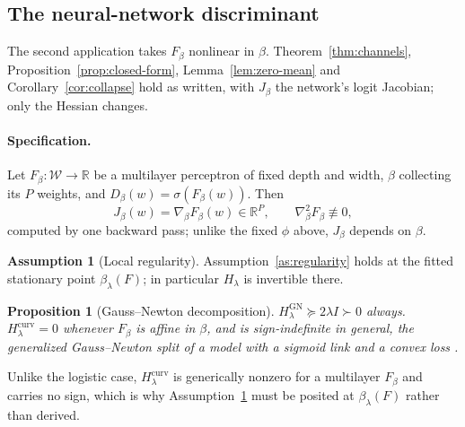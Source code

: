\documentclass[11pt]{article}
\theoremstyle{plain}
\newtheorem{mypropo}{Proposition}
\theoremstyle{definition}
\newtheorem{assumption}{Assumption}
\theoremstyle{remark}
\newcommand{\R}{\mathbb{R}}
\newcommand{\cW}{\ensuremath{\mathcal{W}}}
\begin{document}
\subsection{The neural-network discriminant}
\label{sec:mcd-mlp}

The second application takes $F_\beta$ nonlinear in $\beta$. Theorem~\ref{thm:channels},
Proposition~\ref{prop:closed-form}, Lemma~\ref{lem:zero-mean} and Corollary~\ref{cor:collapse}
hold as written, with $J_\beta$ the network's logit Jacobian; only the Hessian changes.

\paragraph{Specification.}
\label{sec:mcd-mlp-spec}
Let $F_\beta:\cW\to\R$ be a multilayer perceptron of fixed depth and width, $\beta$ collecting
its $P$ weights, and $D_\beta(w)=\sigma(F_\beta(w))$. Then
\begin{equation}
J_\beta(w) = \nabla_\beta F_\beta(w) \in \R^{P},
\qquad
\nabla^2_\beta F_\beta \not\equiv 0 ,
\label{eq:mlp-logit}
\end{equation}
computed by one backward pass; unlike the fixed $\phi$ above, $J_\beta$ depends on $\beta$.

\label{sec:mcd-mlp-ggn}
\begin{assumption}[Local regularity]
\label{as:smooth-mlp}
Assumption~\ref{as:regularity} holds at the fitted stationary point $\beta_\lambda(F)$; in
particular $H_\lambda$ is invertible there.
\end{assumption}

\begin{mypropo}[Gauss--Newton decomposition]
\label{prop:ggn}
$H_\lambda^{\mathrm{GN}} \succeq 2\lambda I \succ 0$ always. $H_\lambda^{\mathrm{curv}} = 0$
whenever $F_\beta$ is affine in $\beta$, and is sign-indefinite in general, the generalized
Gauss--Newton split of a model with a sigmoid link and a convex loss \citep{martens2020}.
\end{mypropo}

Unlike the logistic case, $H_\lambda^{\mathrm{curv}}$ is generically nonzero for a multilayer
$F_\beta$ and carries no sign, which is why Assumption~\ref{as:smooth-mlp} must be posited at
$\beta_\lambda(F)$ rather than derived.
\end{document}
